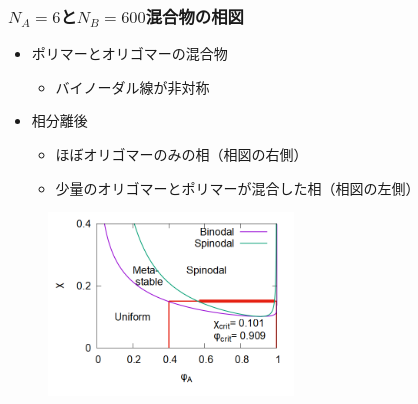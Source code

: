 \documentclass[12pt, dvipdfmx]{beamer}
\begin{document}
\begin{frame}\frametitle{$N_A = 6$と$N_B = 600$混合物の相図}
	\begin{itemize}
		\item ポリマーとオリゴマーの混合物
		\begin{itemize}
			\item バイノーダル線が非対称
		\end{itemize}
		\item 相分離後
		\begin{itemize}
			\item ほぼオリゴマーのみの相（相図の右側）
			\item 少量のオリゴマーとポリマーが混合した相（相図の左側）
		\end{itemize}
	\end{itemize}

	\vspace{-0.5\baselineskip}
	\begin{figure}[htbp]
		\begin{center}
			\includegraphics[width=65mm]{PD_6_600_4.png}
		\end{center}
	\end{figure}
\end{frame}
\end{document}
